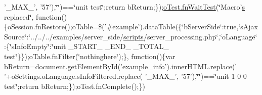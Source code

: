 \begin{DoxyCompactItemize}
'\+\_\+\+M\+A\+X\+\_\+', '57'),\char`\"{}\char`\"{})==\char`\"{}unit test\char`\"{};return b\+Return;\});\hyperlink{onhold_24__server-side_2__zero__config_8js_ab25c4d596771c0133cdc45178ce72c3d}{o\+Test.\+fn\+Wait\+Test}(\char`\"{}Macro'\hyperlink{validate_8js_ae059f217efaf1d50696a1214c3ce5748}{s} replaced\char`\"{}, function()\{o\+Session.\+fn\+Restore();o\+Table=\$('\#example').data\+Table(\{\char`\"{}b\+Server\+Side\char`\"{}\+:true,\char`\"{}s\+Ajax\+Source\char`\"{}\+:\char`\"{}../../../examples/server\+\_\+side/\hyperlink{tinymce_8jquery_8dev_8js_a09066d4d580eeec222f858d588b4cdef}{scripts}/server\+\_\+processing.\+php\char`\"{},\char`\"{}o\+Language\char`\"{}\+:\{\char`\"{}s\+Info\+Empty\char`\"{}\+:\char`\"{}unit \+\_\+\+S\+T\+A\+R\+T\+\_\+ \+\_\+\+E\+N\+D\+\_\+ \+\_\+\+T\+O\+T\+A\+L\+\_\+ test\char`\"{}\}\});o\+Table.\+fn\+Filter(\char`\"{}nothinghere\char`\"{});\}, function()\{var b\+Return=document.\+get\+Element\+By\+Id('example\+\_\+info').inner\+H\+T\+M\+L.\+replace(' '+o\+Settings.\+o\+Language.\+s\+Info\+Filtered.\+replace( '\+\_\+\+M\+A\+X\+\_\+', '57'),\char`\"{}\char`\"{})==\char`\"{}unit 1 0 0 test\char`\"{};return b\+Return;\});o\+Test.\+fn\+Complete();\})
\end{DoxyCompactItemize}


